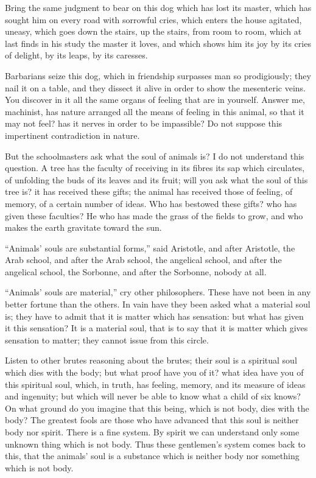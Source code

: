 Bring the same judgment to bear on this dog which has lost its master,
which has sought him on every road with sorrowful cries, which enters
the house agitated, uneasy, which goes down the stairs, up the stairs,
from room to room, which at last finds in his study the master it loves,
and which shows him its joy by its cries of delight, by its leaps, by
its caresses.

Barbarians seize this dog, which in friendship surpasses man so
prodigiously; they nail it on a table, and they dissect it alive in
order to show the mesenteric veins. You discover in it all the same
organs of feeling that are in yourself. Answer me, machinist, has nature
arranged all the means of feeling in this animal, so that it may not
feel? has it nerves in order to be impassible? Do not suppose this
impertinent contradiction in nature.

But the schoolmasters ask what the soul of animals is? I do not
understand this question. A tree has the faculty of receiving in its
fibres its sap which circulates, of unfolding the buds of its leaves and
its fruit; will you ask what the soul of this tree is? it has received
these gifts; the animal has received those of feeling, of memory, of a
certain number of ideas. Who has bestowed these gifts? who has given
these faculties? He who has made the grass of the fields to grow, and
who makes the earth gravitate toward the sun.

\enquote{Animals' souls are substantial forms,} said Aristotle, and after
Aristotle, the Arab school, and after the Arab school, the angelical
school, and after the angelical school, the Sorbonne, and after the
Sorbonne, nobody at all.

\enquote{Animals' souls are material,} cry other philosophers. These have not
been in any better fortune than the others. In vain have they been asked
what a material soul is; they have to admit that it is matter which has
sensation: but what has given it this sensation? It is a material soul,
that is to say that it is matter which gives sensation to matter; they
cannot issue from this circle.

Listen to other brutes reasoning about the brutes; their soul is a
spiritual soul which dies with the body; but what proof have you of it?
what idea have you of this spiritual soul, which, in truth, has feeling,
memory, and its measure of ideas and ingenuity; but which will never be
able to know what a child of six knows? On what ground do you imagine
that this being, which is not body, dies with the body? The greatest
fools are those who have advanced that this soul is neither body nor
spirit. There is a fine system. By spirit we can understand only some
unknown thing which is not body. Thus these gentlemen's system comes
back to this, that the animals' soul is a substance which is neither
body nor something which is not body.

